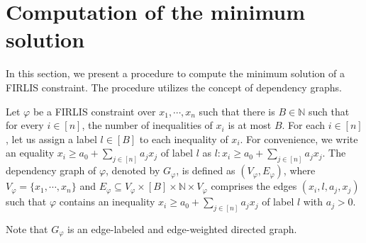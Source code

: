 \documentclass[runningheads]{llncs}
\newcommand\natnum{\mathbb{N}}
\newcommand\intnum{\mathbb{Z}}
\newcommand\firlis{FIRLIS}
\newcommand\hide[1] {}
\begin{document}
\hide{
The following result follows from Proposition~\ref{prop-min-sol}. 
\begin{corollary}\label{cor-min-sum}
Let 
\[\varphi \equiv \bigwedge \limits_{i \in [n]} x_i \ge a_{i,0} + \sum \limits_{j \in [n]} a_{i,j} x_j\]
be a {\firlis} constraint, where $a_{i,0} \in \intnum$ and $a_{i,j} \in \natnum$.
If $(u_1, \cdots, u_n)$ is a solution of $\varphi$ such that $\sum \limits_{i \in [n]} u_i$ is the minimum (among the solutions of $\varphi$), then $(u_1, \cdots, u_n)$ is the minimum solution. 
\end{corollary}

\begin{proof}
Let $(u_1, \cdots, u_n)$ is a solution of $\varphi$ such that $\sum \limits_{i \in [n]} u_i$ is the minimum. Let $(v_1, \cdots, v_n)$ be a solution of $\varphi$. Then $\sum \limits_{i \in [n]} v_i \ge \sum \limits_{i \in [n]} u_i$.

From Proposition~\ref{prop-min-sol}, $(w_1, \cdots, w_n)$ with $w_i = \min(u_i, v_i)$ for each $i \in [n]$ is a solution of $\varphi$. Moreover, $\sum \limits_{i \in [n]} w_i \le \sum  \limits_{i \in [n]} u_i $. From the assumption that $\sum \limits_{i \in [n]} u_i$ is the minimum among the solutions of $\varphi$, it follows that  $\sum \limits_{i \in [n]} w_i = \sum  \limits_{i \in [n]} u_i $. Moreover, from the fact that $w_i \le u_i$ for each $i \in [n]$, we deduce that $w_i = u_i$ for each $i \in [n]$. Therefore, $u_i \le v_i$ for each $i \in [n]$. That is, $(u_1, \cdots, u_n) \preceq_n (v_1, \cdots, v_n)$. We conclude that $(u_1, \cdots, u_n)$ is the minimum solution.
\qed
\end{proof}
}

\section{Computation of the minimum solution}

In this section, we present a procedure to compute the minimum solution of a {\firlis} constraint. The procedure utilizes the concept of dependency graphs. 
\begin{definition}
Let $\varphi$ be a {\firlis} constraint over $x_1, \cdots, x_n$ such that there is $B \in \natnum$ such that for every $i \in [n]$, the number of inequalities of $x_i$ is at most $B$. For each $i \in [n]$, let us assign a label $l \in [B]$ to each inequality of $x_i$. For convenience, we write an equality $x_i \ge a_0 + \sum \limits_{j \in [n]} a_j x_j$ of label $l$ as $l: x_i \ge a_0 + \sum \limits_{j \in [n]} a_j x_j$.
The dependency graph of $\varphi$, denoted by $G_\varphi$, is defined as $(V_\varphi, E_\varphi)$, where $V_\varphi=\{x_1,\cdots, x_n\}$ and $E_\varphi \subseteq V_\varphi \times [B] \times \natnum \times V_\varphi$ comprises the edges $(x_i, l, a_j, x_j)$ such that $\varphi$ contains an inequality $x_i \ge a_0 + \sum \limits_{j \in [n]} a_j x_j$ of label $l$ with $a_j > 0$. 
\end{definition}
Note that $G_\varphi$ is an edge-labeled and edge-weighted directed graph. 
\end{document}
